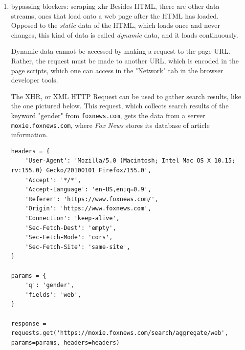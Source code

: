 \documentclass[11pt]{article}
\begin{document}
\begin{enumerate}
\begin{verbatim}
with SB(uc=True, test=True, locale="en") as sb:
    url = "https://www.congress.gov/search?q=%7B%22congress%22%3A%5B%22119%22%5D%2C%22source%22%3A%22all%22%2C%22search%22%3A%22gender%22%7D"
    sb.activate_cdp_mode(url)
    sb.sleep(2)
    sb.solve_captcha()
\end{verbatim}

Because the program is using the actual browser window, it is able to
trick the server into thinking it is a real, not automated, user. By
waiting on the landing page for a few seconds, or even by clicking the
checkbox, as indicated in the function \texttt{solve\_captcha()} above, the
JavaScript that triggers the "Security Verification" could thus
circumvented. With the checkpoint passed, the page loads normally.
Meanwhile, the HTML data is sent to the python program running the
request.

\item bypassing blockers: scraping xhr
\label{sec:org0e26db5}
Besides HTML, there are other data streams, ones that load onto a web
page after the HTML has loaded. Opposed to the \emph{static} data of the
HTML, which loads once and never changes, this kind of data is called
\emph{dynamic} data, and it loads continuously.

Dynamic data cannot be accessed by making a request to the page URL.
Rather, the request must be made to another URL, which is encoded in
the page scripts, which one can access in the "Network" tab in the
browser developer tools.

The XHR, or XML HTTP Request can be used to gather search results,
like the one pictured below. This request, which collects search
results of the keyword "gender" from \texttt{foxnews.com}, gets the data from
a server \texttt{moxie.foxnews.com}, where \emph{Fox News} stores its database of
article information.

\begin{verbatim}
headers = {
    'User-Agent': 'Mozilla/5.0 (Macintosh; Intel Mac OS X 10.15; rv:155.0) Gecko/20100101 Firefox/155.0',
    'Accept': '*/*',
    'Accept-Language': 'en-US,en;q=0.9',
    'Referer': 'https://www.foxnews.com/',
    'Origin': 'https://www.foxnews.com',
    'Connection': 'keep-alive',
    'Sec-Fetch-Dest': 'empty',
    'Sec-Fetch-Mode': 'cors',
    'Sec-Fetch-Site': 'same-site',
}

params = {
    'q': 'gender',
    'fields': 'web',
}

response = requests.get('https://moxie.foxnews.com/search/aggregate/web', params=params, headers=headers)


\end{verbatim}
\end{enumerate}
\end{document}

